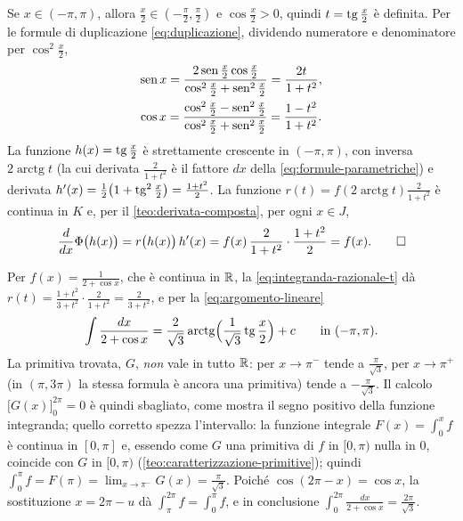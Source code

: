 \begin{dimostrazione}
Se $x\in(-\pi,\pi)$, allora $\frac x2\in(-\frac\pi2,\frac\pi2)$ e $\cos\frac x2>0$, quindi
$t=\operatorname{tg}\frac x2$ è definita. Per le formule di duplicazione \eqref{eq:duplicazione},
dividendo numeratore e denominatore per $\cos^{2}\frac x2$,
\[
\begin{gathered}
  \operatorname{sen} x=\frac{2\operatorname{sen}\frac x2\cos\frac x2}{\cos^{2}\frac x2+\operatorname{sen}^{2}\frac x2}
  =\frac{2t}{1+t^{2}},\\
  \cos x=\frac{\cos^{2}\frac x2-\operatorname{sen}^{2}\frac x2}{\cos^{2}\frac x2+\operatorname{sen}^{2}\frac x2}
  =\frac{1-t^{2}}{1+t^{2}} .
\end{gathered}
\]
La funzione $h(x)=\operatorname{tg}\frac x2$ è strettamente crescente in $(-\pi,\pi)$, con inversa
$2\operatorname{arctg}t$ (la cui derivata $\frac2{1+t^{2}}$ è il fattore $dx$ della
\eqref{eq:formule-parametriche}) e derivata $h'(x)=\frac12\bigl(1+\operatorname{tg}^{2}\frac x2\bigr)
=\frac{1+t^{2}}2$. La funzione $r(t)=f(2\operatorname{arctg}t)\frac2{1+t^{2}}$ è continua in $K$
e, per il \cref{teo:derivata-composta}, per ogni $x\in J$,
\[
  \frac{d}{dx}\Phi\bigl(h(x)\bigr)=r\bigl(h(x)\bigr)\,h'(x)
  =f(x)\,\frac2{1+t^{2}}\cdot\frac{1+t^{2}}2=f(x) . \qedhere
\]
\end{dimostrazione}

\begin{esempio}\label{es:due-piu-coseno}
Per $f(x)=\frac1{2+\cos x}$, che è continua in $\mathbb{R}$, la
\eqref{eq:integranda-razionale-t} dà
$r(t)=\frac{1+t^{2}}{3+t^{2}}\cdot\frac2{1+t^{2}}=\frac2{3+t^{2}}$, e per la
\eqref{eq:argomento-lineare}
\[
  \int\frac{dx}{2+\cos x}=\frac2{\sqrt3}\operatorname{arctg}\Bigl(\frac1{\sqrt3}\operatorname{tg}\frac x2\Bigr)+c
  \qquad\text{in }(-\pi,\pi) .
\]
La primitiva trovata, $G$, \emph{non} vale in tutto $\mathbb{R}$: per $x\to\pi^{-}$ tende a
$\frac\pi{\sqrt3}$, per $x\to\pi^{+}$ (in $(\pi,3\pi)$ la stessa formula è ancora una
primitiva) tende a $-\frac\pi{\sqrt3}$. Il calcolo $\bigl[G(x)\bigr]_{0}^{2\pi}=0$ è
quindi sbagliato, come mostra il segno positivo della funzione integranda; quello
corretto spezza l'intervallo:
la funzione integrale $F(x)=\int_{0}^{x}f$ è continua in $[0,\pi]$ e, essendo come $G$ una
primitiva di $f$ in $[0,\pi)$ nulla in $0$, coincide con $G$ in $[0,\pi)$
(\cref{teo:caratterizzazione-primitive}); quindi
$\int_{0}^{\pi}f=F(\pi)=\lim_{x\to\pi^{-}}G(x)=\frac\pi{\sqrt3}$. Poiché
$\cos(2\pi-x)=\cos x$, la sostituzione $x=2\pi-u$ dà $\int_{\pi}^{2\pi}f=\int_{0}^{\pi}f$, e
in conclusione $\int_{0}^{2\pi}\frac{dx}{2+\cos x}=\frac{2\pi}{\sqrt3}$.
\end{esempio}

